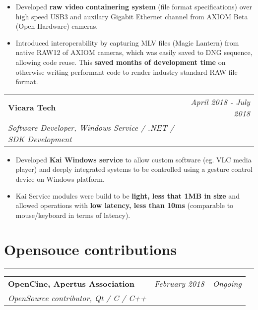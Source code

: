 \documentclass[10pt, a4paper]{article}
\begin{document}
\begin{itemize}
	\itemsep0em
	\item Developed \textbf{raw video containering system} (file format specifications) over high speed USB3 and auxilary Gigabit Ethernet channel from AXIOM Beta (Open Hardware) cameras.
	\item Introduced interoperability by capturing MLV files (Magic Lantern) from native RAW12 of AXIOM cameras, which was easily saved to DNG sequence, allowing code reuse. This \textbf{saved months of development time} on otherwise writing performant code to render industry standard RAW file format.
\end{itemize}

\vspace{8px}
\hspace{5px}
\begin{tabularx}{\textwidth}{X r}
	\textbf{Vicara Tech} & \textit{April 2018 - July 2018} \\
	\textit{\small Software Developer, Windows Service / .NET / SDK Development} & \\
\end{tabularx}

\begin{itemize}
	\itemsep0em
	\item Developed \textbf{Kai Windows service} to allow custom software (eg. VLC media player) and deeply integrated systems to be controlled using a gesture control device on Windows platform.
	\item Kai Service modules were build to be \textbf{light, less that 1MB in size} and allowed operations with \textbf{low latency, less than 10ms} (comparable to mouse/keyboard in terms of latency).
\end{itemize}

\section*{Opensouce contributions}
\vspace{-8px}
\hrule
\vspace{8px}
\hspace{5px}
\begin{tabularx}{\textwidth}{X r}
	\textbf{OpenCine, Apertus Association} & \textit{February 2018 - Ongoing	} \\
	\textit{\small OpenSource contributor, Qt / C / C++} & \\
\end{tabularx}
\end{document}
